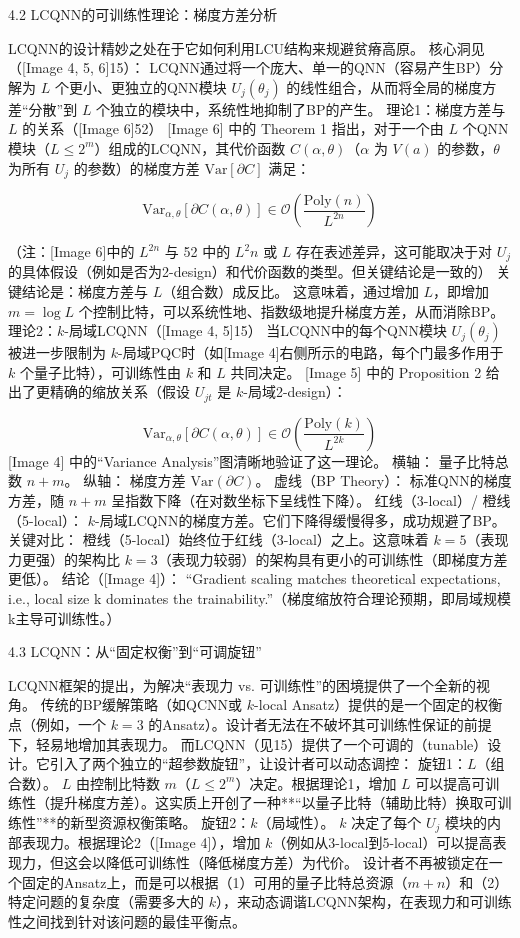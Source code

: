 \documentclass[12pt,a4paper]{article}
\begin{document}
4.2 LCQNN的可训练性理论：梯度方差分析

LCQNN的设计精妙之处在于它如何利用LCU结构来规避贫瘠高原。
核心洞见（[Image 4, 5, 6]15）：
LCQNN通过将一个庞大、单一的QNN（容易产生BP）分解为 $L$ 个更小、更独立的QNN模块 $U_j(\theta_j)$ 的线性组合，从而将全局的梯度方差“分散”到 $L$ 个独立的模块中，系统性地抑制了BP的产生。
理论1：梯度方差与 $L$ 的关系（[Image 6]52）
[Image 6] 中的 Theorem 1 指出，对于一个由 $L$ 个QNN模块（$L \le 2^m$）组成的LCQNN，其代价函数 $C(\alpha, \theta)$（$\alpha$ 为 $V(a)$ 的参数，$\theta$ 为所有 $U_j$ 的参数）的梯度方差 $\text{Var}[\partial C]$ 满足：

$$\text{Var}_{\alpha, \theta}[\partial C(\alpha, \theta)] \in \mathcal{O}\left(\frac{\text{Poly}(n)}{L^{2n}}\right)$$

（注：[Image 6]中的 $L^{2n}$ 与 52 中的 $L^2 n$ 或 $L$ 存在表述差异，这可能取决于对 $U_j$ 的具体假设（例如是否为2-design）和代价函数的类型。但关键结论是一致的）
关键结论是：梯度方差与 $L$（组合数）成反比。 这意味着，通过增加 $L$，即增加 $m = \log L$ 个控制比特，可以系统性地、指数级地提升梯度方差，从而消除BP。
理论2：$k$-局域LCQNN（[Image 4, 5]15）
当LCQNN中的每个QNN模块 $U_j(\theta_j)$ 被进一步限制为 $k$-局域PQC时（如[Image 4]右侧所示的电路，每个门最多作用于 $k$ 个量子比特），可训练性由 $k$ 和 $L$ 共同决定。
[Image 5] 中的 Proposition 2 给出了更精确的缩放关系（假设 $U_{jt}$ 是 $k$-局域2-design）：

$$\text{Var}_{\alpha, \theta}[\partial C(\alpha, \theta)] \in \mathcal{O}\left(\frac{\text{Poly}(k)}{L^{2k}}\right)$$
[Image 4] 中的“Variance Analysis”图清晰地验证了这一理论。
横轴： 量子比特总数 $n+m$。
纵轴： 梯度方差 $\text{Var}(\partial C)$。
虚线（BP Theory）： 标准QNN的梯度方差，随 $n+m$ 呈指数下降（在对数坐标下呈线性下降）。
红线（3-local）/ 橙线（5-local）： $k$-局域LCQNN的梯度方差。它们下降得缓慢得多，成功规避了BP。
关键对比： 橙线（5-local）始终位于红线（3-local）之上。这意味着 $k=5$（表现力更强）的架构比 $k=3$（表现力较弱）的架构具有更小的可训练性（即梯度方差更低）。
结论（[Image 4]）： “Gradient scaling matches theoretical expectations, i.e., local size k dominates the trainability.”（梯度缩放符合理论预期，即局域规模k主导可训练性。）

4.3 LCQNN：从“固定权衡”到“可调旋钮”

LCQNN框架的提出，为解决“表现力 vs. 可训练性”的困境提供了一个全新的视角。
传统的BP缓解策略（如QCNN或 $k$-local Ansatz）提供的是一个固定的权衡点（例如，一个 $k=3$ 的Ansatz）。设计者无法在不破坏其可训练性保证的前提下，轻易地增加其表现力。
而LCQNN（见15）提供了一个可调的（tunable）设计。它引入了两个独立的“超参数旋钮”，让设计者可以动态调控：
旋钮1：$L$（组合数）。 $L$ 由控制比特数 $m$（$L \le 2^m$）决定。根据理论1，增加 $L$ 可以提高可训练性（提升梯度方差）。这实质上开创了一种**“以量子比特（辅助比特）换取可训练性”**的新型资源权衡策略。
旋钮2：$k$（局域性）。 $k$ 决定了每个 $U_j$ 模块的内部表现力。根据理论2（[Image 4]），增加 $k$（例如从3-local到5-local）可以提高表现力，但这会以降低可训练性（降低梯度方差）为代价。
设计者不再被锁定在一个固定的Ansatz上，而是可以根据（1）可用的量子比特总资源（$m+n$）和（2）特定问题的复杂度（需要多大的 $k$），来动态调谐LCQNN架构，在表现力和可训练性之间找到针对该问题的最佳平衡点。
\end{document}
